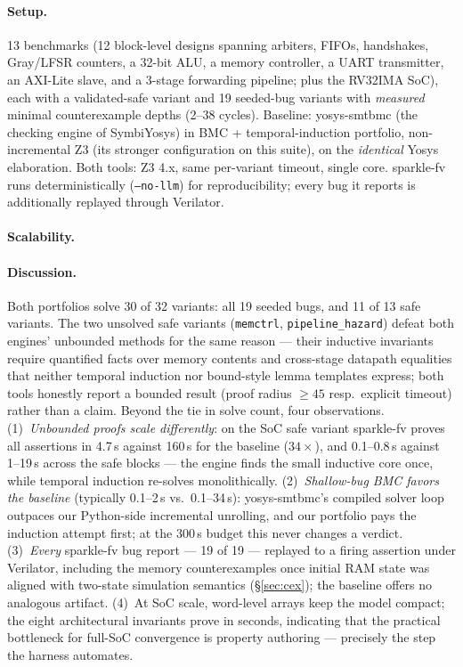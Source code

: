 \documentclass[11pt]{article}
\newcommand{\sfv}{\textsf{sparkle-fv}}
\newcommand{\tool}[1]{\textsf{#1}}
\begin{document}
\paragraph{Setup.} 13 benchmarks (12 block-level designs spanning
arbiters, FIFOs, handshakes, Gray/LFSR counters, a 32-bit ALU, a memory
controller, a UART transmitter, an AXI-Lite slave, and a 3-stage forwarding
pipeline; plus the RV32IMA SoC), each with a validated-safe variant and 19
seeded-bug variants with \emph{measured} minimal counterexample depths
(2--38 cycles). Baseline: \tool{yosys-smtbmc} (the checking engine of
SymbiYosys) in BMC + temporal-induction portfolio, non-incremental Z3 (its
stronger configuration on this suite), on the \emph{identical} Yosys
elaboration. Both tools: Z3 4.x, same per-variant timeout, single core.
\sfv{} runs deterministically (\texttt{--no-llm}) for reproducibility; every
bug it reports is additionally replayed through Verilator.





\paragraph{Scalability.} 

\paragraph{Discussion.} Both portfolios solve 30 of 32 variants: all 19
seeded bugs, and 11 of 13 safe variants. The two unsolved safe variants
(\texttt{memctrl}, \texttt{pipeline\_hazard}) defeat both engines'
unbounded methods for the same reason --- their inductive invariants require
quantified facts over memory contents and cross-stage datapath equalities
that neither temporal induction nor bound-style lemma templates express;
both tools honestly report a bounded result (proof radius $\geq 45$ resp.\
explicit timeout) rather than a claim. Beyond the tie in solve count, four
observations. (1)~\emph{Unbounded proofs scale differently}: on the SoC
safe variant \sfv{} proves all assertions in 4.7\,s against 160\,s for the
baseline ($34\times$), and 0.1--0.8\,s against 1--19\,s across the safe
blocks --- the engine finds the small inductive core once, while temporal
induction re-solves monolithically. (2)~\emph{Shallow-bug BMC favors the
baseline} (typically 0.1--2\,s vs.\ 0.1--34\,s): \tool{yosys-smtbmc}'s
compiled solver loop outpaces our Python-side incremental unrolling, and our
portfolio pays the induction attempt first; at the 300\,s budget this never
changes a verdict. (3)~\emph{Every} \sfv{} bug report --- 19 of 19 ---
replayed to a firing assertion under Verilator, including the memory
counterexamples once initial RAM state was aligned with two-state
simulation semantics (\S\ref{sec:cex}); the baseline offers no analogous
artifact. (4)~At SoC scale, word-level arrays keep the model compact; the
eight architectural invariants prove in seconds, indicating that the
practical bottleneck for full-SoC convergence is property authoring ---
precisely the step the harness automates.
\end{document}
